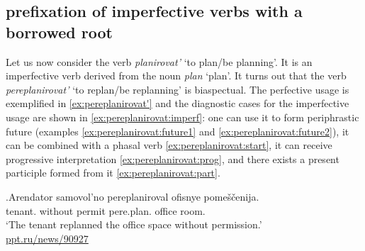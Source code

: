 
\subsection{prefixation  of imperfective verbs  with a borrowed root}\label{subsection:perf:imperf}
Let us now consider the verb \textit{planirovat'} `to plan/be planning'. It is an imperfective verb  derived from the noun \textit{plan} `plan'. It turns out that the verb \textit{pereplanirovat'} `to replan/be replanning' is biaspectual. The perfective usage is exemplified in \ref{ex:pereplanirovat'} and the diagnostic cases for the imperfective usage are shown in \ref{ex:pereplanirovat:imperf}: one can use it to form periphrastic future  (examples \ref{ex:pereplanirovat:future1} and \ref{ex:pereplanirovat:future2}), it can be combined with a phasal verb  \ref{ex:pereplanirovat:start}, it can receive progressive interpretation  \ref{ex:pereplanirovat:prog}, and there exists a present participle  formed from it \ref{ex:pereplanirovat:part}. 

\exg.\label{ex:pereplanirovat'}Arendator samovol'no pereplaniroval\textsuperscript{\PF} ofisnye pome\v{s}\v{c}enija.\\
tenant. {without permit} pere.plan. office room.\\
\trans `The tenant replanned the office space without permission.'\\\hbox{}\hfill\hbox{\url{ppt.ru/news/90927}}


